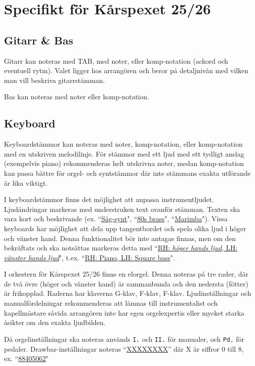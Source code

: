 \chapter{Specifikt för Kårspexet 25/26}
\section{Gitarr \& Bas}
Gitarr kan noteras med TAB, med noter, eller komp-notation (ackord och eventuell rytm). Valet ligger hos arrangören och beror på detaljnivån med vilken man vill beskriva gitarrstämman. 

Bas kan noteras med noter eller komp-notation.


\section{Keyboard}
Keyboardstämmor kan noteras med noter, komp-notation, eller komp-notation med en utskriven melodilinje. För stämmor med ett ljud med ett tydligt anslag (exempelvis piano) rekommenderas helt utskrivna noter, medan komp-notation kan passa bättre för orgel- och syntstämmor där inte stämmans exakta utförande är lika viktigt.


I keyboardstämmor finns det möjlighet att anpassa instrumentljudet. Ljudändringar markeras med understruken text ovanför stämman. Texten ska vara kort och beskrivande (ex. ``\underline{Såg-synt}", ``\underline{80s brass}", ``\underline{Marimba}"). Vissa keyboards har möjlighet att dela upp tangentbordet och spela olika ljud i höger och vänster hand. Denna funktionalitet bör inte antagas finnas, men om den bekräftats och ska notsättas markeras detta med ``\underline{RH: \textit{höger hands ljud}, LH: \textit{vänster hands ljud}}", t.ex. ``\underline{RH: Piano, LH: Square bass}".

\vspace{1em}
I orkestern för Kårspexet 25/26 finns en elorgel. Denna noteras på tre rader, där de två övre (höger och vänster hand) är sammanbunda och den nedersta (fötter) är frikopplad. Raderna har klaverna G-klav, F-klav, F-klav. Ljudinställningar och manualfördelningar rekommenderas att lämnas till instrumentalist och kapellmästare såvida arrangören inte har egen orgelexpertis eller mycket starka åsikter om den exakta ljudbilden. 

Då orgelinställningar ska noteras används \verb|I.| och \verb|II.| för manualer, och \verb|Pd.| för pedaler. Drawbar-inställningar noteras ``\underline{XXXXXXXX}'' där X är siffror 0 till 8, ex. ``\underline{88405062}"

